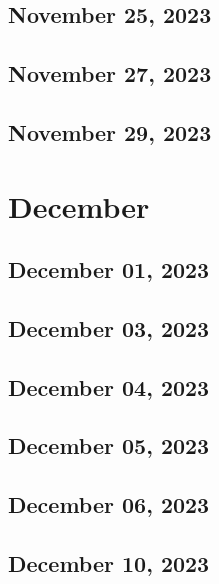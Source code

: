 \section{November 25, 2023}


\section{November 27, 2023}


\section{November 29, 2023}



\chapter{December}
\section{December 01, 2023}

\section{December 03, 2023}

\section{December 04, 2023}

\section{December 05, 2023}

\section{December 06, 2023}

\section{December 10, 2023}

